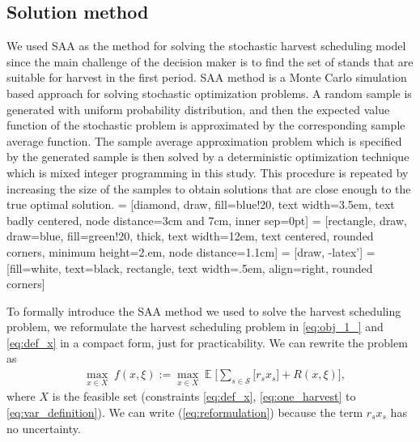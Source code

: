 \documentclass[forests,article,submit,moreauthors,pdftex]{Definitions/mdpi}
\begin{document}
\subsection{Solution method}
We used SAA as the method for solving the stochastic harvest scheduling model since the main challenge of the decision maker is to find the set of stands that are suitable for harvest in the first period. SAA method is a Monte Carlo simulation based  approach for solving stochastic optimization problems. A random sample is generated with uniform probability distribution, and then the expected value function of the stochastic problem is approximated by the corresponding sample average function. The sample average approximation problem which is specified by the generated sample is then solved by a deterministic optimization technique which is mixed integer programming in this study. This procedure is repeated by increasing the  size of the samples to obtain solutions that are close enough to the true optimal solution.
 = [diamond, draw, fill=blue!20, 
    text width=3.5em, text badly centered, node distance=3cm and 7cm, inner sep=0pt]
 = [rectangle, draw, draw=blue, fill=green!20,  thick, 
    text width=12em, text centered, rounded corners, minimum height=2.em, node distance=1.1cm]
 = [draw, -latex']
 =[fill=white, text=black, rectangle, text width=.5em, align=right, rounded corners]


To formally introduce the SAA method we used to solve the harvest scheduling problem, we reformulate the harvest scheduling problem  in \eqref{eq:obj_1_} and \eqref{eq:def_x} in a compact form, just for practicability. We can rewrite the problem as
\begin{align}
    & \max_{x \in X} \; f(x, \xi) := \max_{x \in X} \operatorname{\mathbb{E}}\Bigg[ \sum_{s \in \mathcal{S}}\big[r_{s} x_{s}\big] + R(x, \xi) \Bigg], \label{eq:reformulation}
\end{align}
where $X$ is the feasible set (constraints \eqref{eq:def_x}, \eqref{eq:one_harvest} to \eqref{eq:var_definition}). We can write (\ref{eq:reformulation}) because the term $r_{s} x_{s}$ has no uncertainty.
\end{document}
